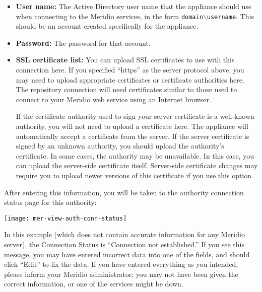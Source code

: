 \begin{itemize}

\item \textbf{User name:} The Active Directory user name that the
appliance should use when connecting to the Meridio services, in the
form \texttt{domain$\backslash{}$username}. This should be an account
created specifically for the appliance.


\item \textbf{Password:} The password for that account.

\item \textbf{SSL certificate list:}
You can upload SSL certificates to use with this connection here. If
you specified ``https'' as the server protocol above, you may need to
upload appropriate certificates or certificate authorities here. The
repository connection will need certificates similar to those used to
connect to your Meridio web service using an Internet browser.


If the certificate authority used to sign your server certificate is a
well-known authority, you will not need to upload a certificate
here. The appliance will automatically accept a certificate from the
server. If the server certificate is signed by an unknown authority,
you should upload the authority's certificate. In some cases, the
authority may be unavailable. In this case, you can upload the
server-side certificate itself. Server-side certificate changes may
require you to upload newer versions of this certificate if you use
this option.


\end{itemize}


After entering this information, you will be taken to the authority
connection status page for this authority:

\texttt{[image: mer-view-auth-conn-status]}

In this example (which does not contain accurate information for any
Meridio server), the Connection Status is ``Connection not established.''
If you see this message, you may have entered incorrect data into one
of the fields, and should click ``Edit'' to fix the data. If you have
entered everything as you intended, please inform your Meridio
administrator; you may not have been given the correct information,
or one of the services might be down.


